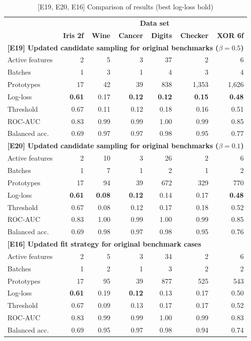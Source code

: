 %
\begin{table}
\caption{[E19, E20, E16] Comparison of results (best log-loss bold)}
\label{tab_e19_e20_e16}
%
\begin{center}
\small
\begin{tabular}{|lrrrrrr|}
\hline
&\multicolumn{6}{c|}{\textbf{\hrulefill\ Data set \hrulefill}}\\
&\textbf{Iris 2f}&\textbf{Wine}&\textbf{Cancer}&\textbf{Digits}&\textbf{Checker}&\textbf{XOR 6f}\\
\multicolumn{7}{|l|}{\textbf{[E19] Updated candidate sampling for original benchmarks ($\beta=0.5$)}}\\
Active features&2&5&3&37&2&6\\
Batches&1&3&1&4&3&4\\
Prototypes&17&42&39&838&1,353&1,626\\
Log-loss&\textbf{0.61}&0.17&\textbf{0.12}&\textbf{0.12}&\textbf{0.15}&\textbf{0.48}\\
Threshold&0.67&0.11&0.12&0.18&0.16&0.51\\
ROC-AUC&0.83&0.99&0.99&1.00&0.99&0.85\\
Balanced acc.&0.69&0.97&0.97&0.98&0.95&0.77\\
\multicolumn{7}{|l|}{\textbf{[E20] Updated candidate sampling for original benchmarks ($\beta=0.1$)}}\\
Active features&2&10&3&26&2&6\\
Batches&1&7&1&2&1&2\\
Prototypes&17&94&39&672&329&770\\
Log-loss&\textbf{0.61}&\textbf{0.08}&\textbf{0.12}&0.14&0.17&\textbf{0.48}\\
Threshold&0.67&0.08&0.12&0.17&0.18&0.52\\
ROC-AUC&0.83&1.00&0.99&1.00&0.99&0.85\\
Balanced acc.&0.69&0.98&0.97&0.98&0.95&0.76\\
\multicolumn{7}{|l|}{\textbf{[E16] Updated fit strategy for original benchmark cases}}\\
Active features&2&5&3&34&2&6\\
Batches&1&2&1&3&2&2\\
Prototypes&17&95&39&877&525&543\\
Log-loss&\textbf{0.61}&0.19&\textbf{0.12}&0.13&0.17&0.50\\
Threshold&0.67&0.09&0.13&0.17&0.17&0.52\\
ROC-AUC&0.83&0.99&0.99&1.00&0.99&0.83\\
Balanced acc.&0.69&0.95&0.97&0.98&0.94&0.74\\
\hline
\end{tabular}
\end{center}
\end{table}
